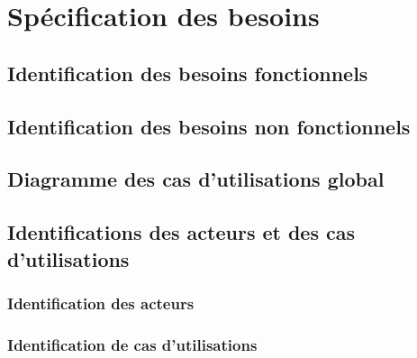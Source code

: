 
\chapter{Spécification des besoins}

\setcounter{page}{1}
\thispagestyle{empty}

\newpage


\fancyhf{}%
{\headrule
  { \thepage}\footrule}
\pagestyle{ruled}

\renewcommand\makeheadrule{\color{cyan}\rule[-.3\baselineskip]{\linewidth}{2.5pt}}
\renewcommand\makefootrule{\color{cyan}\rule[\baselineskip]{\linewidth}{2.5pt}}



 \section{Identification des besoins fonctionnels}
 
 \section{Identification des besoins non fonctionnels}
 
 
 \section{Diagramme des cas d'utilisations global}
 
 
 \section{Identifications des acteurs et des cas d'utilisations}
 
 \subsection{Identification des acteurs}
 
 \subsection{Identification de cas d'utilisations}
 